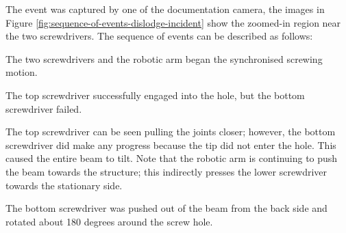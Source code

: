 The event was captured by one of the documentation camera, the images in Figure \ref{fig:sequence-of-events-dislodge-incident} show the zoomed-in region near the two screwdrivers. The sequence of events can be described as follows:

\begin{description}[]
    \item[Step 1] The two screwdrivers and the robotic arm began the synchronised screwing motion.
    \item[Step 2] The top screwdriver successfully engaged into the hole, but the bottom screwdriver failed.
    \item[Step 3] The top screwdriver can be seen pulling the joints closer; however, the bottom screwdriver did make any progress because the tip did not enter the hole. This caused the entire beam to tilt. Note that the robotic arm is continuing to push the beam towards the structure; this indirectly presses the lower screwdriver towards the stationary side.
    \item[Step 4] The bottom screwdriver was pushed out of the beam from the back side and rotated about 180 degrees around the screw hole.
\end{description}

